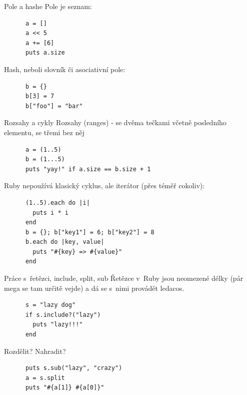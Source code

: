 \documentclass{beamer}
\begin{document}
\begin{frame}[fragile]{Pole a hashe}
  Pole je seznam:
  \begin{block}{}
    {\scriptsize \begin{verbatim}
      a = []
      a << 5
      a += [6]
      puts a.size
    \end{verbatim}}
  \end{block}
  \pause
  Hash, neboli slovník či asociativní pole:
  \begin{block}{}
    {\scriptsize \begin{verbatim}
      b = {}
      b[3] = 7
      b["foo"] = "bar"
    \end{verbatim}}
  \end{block}
\end{frame}

\begin{frame}[fragile]{Rozsahy a cykly}
  Rozsahy (ranges) - se dvěma tečkami včetně posledního elementu, se třemi bez něj
  \begin{block}{}
    {\scriptsize \begin{verbatim}
      a = (1..5)
      b = (1...5)
      puts "yay!" if a.size == b.size + 1
    \end{verbatim}}
  \end{block}
  \pause
  Ruby nepoužívá klasický cyklus, ale iterátor (přes téměř cokoliv):
  \begin{block}{}
    {\scriptsize \begin{verbatim}
      (1..5).each do |i|
        puts i * i
      end
      b = {}; b["key1"] = 6; b["key2"] = 8
      b.each do |key, value|
        puts "#{key} => #{value}"
      end
    \end{verbatim}}
  \end{block}
\end{frame}

\begin{frame}[fragile]{Práce s~řetězci, include, split, sub}
  Řetězce v~Ruby jsou neomezené délky (pár mega se tam určitě vejde) a dá se s~nimi provádět ledacos.
  \begin{block}{}
    {\scriptsize \begin{verbatim}
      s = "lazy dog"
      if s.include?("lazy")
        puts "lazy!!!"
      end
    \end{verbatim}}
  \end{block}
  \pause
  Rozdělit? Nahradit?
  \begin{block}{}
    {\scriptsize \begin{verbatim}
      puts s.sub("lazy", "crazy")
      a = s.split
      puts "#{a[1]} #{a[0]}"
    \end{verbatim}}
  \end{block}
\end{frame}
\end{document}
